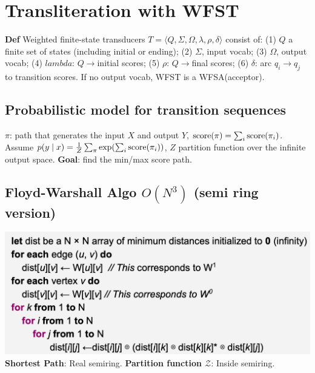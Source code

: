 \section{Transliteration with WFST}



\textbf{Def} Weighted finite-state transducers $T=\langle Q, \Sigma, \Omega, \lambda, \rho, \delta\rangle$ consist of: (1) $Q$ a finite set of states (including initial or ending); (2) $\Sigma$, input vocab; (3) $\Omega$, output vocab; (4) $lambda$: $Q\to$initial scores; (5) $\rho$: $Q\to$final scores; (6) $\delta$: arc $q_i\to q_j$ to transition scores. If no output vocab, WFST is a WFSA(acceptor).

\subsection*{Probabilistic model for transition sequences}
$\pi$: path that generates the input $X$ and output $Y$, $\text{score}(\pi) = \sum_i \text{score}(\pi_i)$. Assume $p(y\mid x)=\frac{1}{Z} \sum_\pi \exp(\sum_i \text{score}(\pi_i))$, $Z$ partition function over the infinite output space. \textbf{Goal}: find the min/max score path.

\subsection*{Floyd-Warshall Algo $O(N^3)$ (semi ring version)}
\includegraphics[width=\columnwidth]{img/FWalgoSemiRing.png}
\textbf{Shortest Path}: Real semiring. \textbf{Partition function $\mathcal{Z}$}: Inside semiring.

